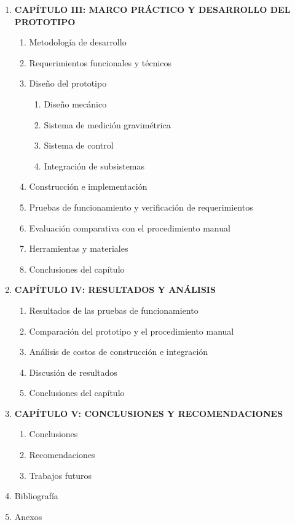 \begin{enumerate}
    \item \textbf{CAPÍTULO III: MARCO PRÁCTICO Y DESARROLLO DEL PROTOTIPO}
    \begin{enumerate}
        \item Metodología de desarrollo
        \item Requerimientos funcionales y técnicos
        \item Diseño del prototipo
        \begin{enumerate}
            \item Diseño mecánico
            \item Sistema de medición gravimétrica
            \item Sistema de control
            \item Integración de subsistemas
        \end{enumerate}
        \item Construcción e implementación
        \item Pruebas de funcionamiento y verificación de requerimientos
        \item Evaluación comparativa con el procedimiento manual
        \item Herramientas y materiales
        \item Conclusiones del capítulo
    \end{enumerate}

    \item \textbf{CAPÍTULO IV: RESULTADOS Y ANÁLISIS}
    \begin{enumerate}
        \item Resultados de las pruebas de funcionamiento
        \item Comparación del prototipo y el procedimiento manual
        \item Análisis de costos de construcción e integración
        \item Discusión de resultados
        \item Conclusiones del capítulo
    \end{enumerate}

    \item \textbf{CAPÍTULO V: CONCLUSIONES Y RECOMENDACIONES}
    \begin{enumerate}
        \item Conclusiones
        \item Recomendaciones
        \item Trabajos futuros
    \end{enumerate}
    \item Bibliografía
    \item Anexos
\end{enumerate}

